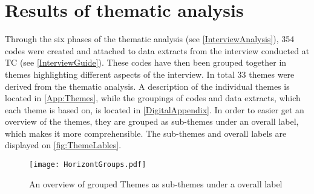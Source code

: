 \chapter{Results of thematic analysis}
\label{ThemanticAnalysis}


\noindent
Through the six phases of the thematic analysis (see \autoref{InterviewAnalysis}), 354 codes were created and attached to data extracts from the interview conducted at TC (see \autoref{InterviewGuide}). These codes have then been grouped together in themes highlighting different aspects of the interview. In total 33 themes were derived from the thematic analysis. A description of the individual themes is located in \autoref{App:Themes}, while the groupings of codes and data extracts, which each theme is based on, is located in \autoref{DigitalAppendix}. In order to easier get an overview of the themes, they are grouped as sub-themes under an overall label, which makes it more comprehensible. The sub-themes and overall labels are displayed on \autoref{fig:ThemeLables}.

\begin{figure}[H]
	\centering
	\texttt{[image: HorizontGroups.pdf]}
	\caption{An overview of grouped Themes as sub-themes under a overall label}
	\label{fig:ThemeLables}
\end{figure}

